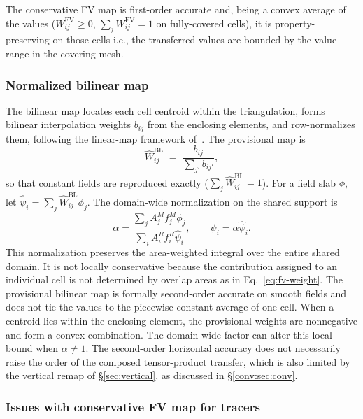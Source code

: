 The conservative FV map is first-order accurate and, being
a convex average of the \MPAS values ($W^{\mathrm{FV}}_{ij}\ge 0$,
$\sum_j W^{\mathrm{FV}}_{ij}=1$ on fully-covered cells), it is
property-preserving on those cells i.e., the transferred values are bounded
by the \MPAS value range in the covering mesh.

\subsubsection{Normalized bilinear map}
The bilinear map locates each \ROMS cell centroid within the
\MPAS triangulation, forms bilinear interpolation weights
$b_{ij}$ from the enclosing \MPAS elements, and row-normalizes them, following the linear-map framework of~\citet{ullrich2015arbitrary,ullrich2016tempestremap}. The provisional map is
\begin{equation}
  \widehat{W}^{\mathrm{BL}}_{ij}
  \;=\; \frac{b_{ij}}{\sum_{j'} b_{ij'}} ,
  \label{conv:eq:bilin-weight}
\end{equation}
so that constant fields are reproduced exactly
($\sum_j \widehat{W}^{\mathrm{BL}}_{ij}=1$). For a field slab $\phi$,
let $\widehat{\psi}_i=\sum_j\widehat{W}^{\mathrm{BL}}_{ij}\phi_j$.
The domain-wide normalization on the shared support is
\begin{equation}
 \alpha=
 \frac{\sum_j A^M_j f^M_j\phi_j}
      {\sum_i A^R_i f^R_i\widehat{\psi}_i},
 \qquad
 \psi_i=\alpha\widehat{\psi}_i.
 \label{eq:bilin-global-normalization}
\end{equation}
This normalization preserves the area-weighted integral over the entire
shared domain. It is not locally conservative because the contribution
assigned to an individual \ROMS cell is not determined by overlap areas
as in Eq.~\eqref{eq:fv-weight}. The provisional bilinear map is formally
second-order accurate on smooth fields \citep{ullrich2015arbitrary} and
does not tie the \ROMS values to the piecewise-constant average of one
\MPAS cell. When a \ROMS centroid lies within the enclosing \MPAS element,
the provisional weights are nonnegative and form a convex combination.
The domain-wide factor can alter this local bound when $\alpha\ne1$.
The second-order horizontal accuracy does not necessarily raise the order
of the composed tensor-product transfer, which is also limited by the
vertical remap of \S\ref{sec:vertical}, as discussed in
\S\ref{conv:sec:conv}.



\subsubsection{Issues with conservative FV map for tracers}\label{sec:why-not-fv}

